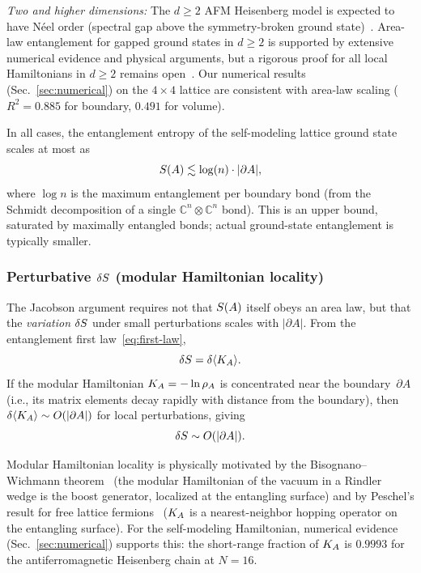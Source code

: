 \emph{Two and higher dimensions:}  The $d \geq 2$ AFM Heisenberg model
is expected to have N\'eel order (spectral gap above the
symmetry-broken ground state)~\cite{EisertCramerPlenio2010}.  Area-law
entanglement for gapped ground states in $d \geq 2$ is supported by
extensive numerical evidence and physical arguments, but a rigorous
proof for all local Hamiltonians in $d \geq 2$ remains
open~\cite{EisertCramerPlenio2010}.  Our numerical results
(Sec.~\ref{sec:numerical}) on the $4 \times 4$ lattice are consistent
with area-law scaling ($R^2 = 0.885$ for boundary, $0.491$ for volume).

In all cases, the entanglement entropy of the self-modeling lattice
ground state scales at most as
\begin{equation}
  S(A) \lesssim \log(n) \cdot |\partial A|,
  \label{eq:channel-bound}
\end{equation}
where $\log n$ is the maximum entanglement per boundary bond (from the
Schmidt decomposition of a single $\mathbb{C}^n \otimes \mathbb{C}^n$
bond).  This is an upper bound, saturated by maximally entangled bonds;
actual ground-state entanglement is typically smaller.

\subsubsection{Perturbative $\delta S$ (modular Hamiltonian locality)}
\label{sec:delta-s}

The Jacobson argument requires not that $S(A)$ itself obeys an area
law, but that the \emph{variation} $\delta S$ under small
perturbations scales with $|\partial A|$.  From the entanglement first
law~\eqref{eq:first-law},
\begin{equation}
  \delta S = \delta\langle K_A\rangle.
  \label{eq:delta-s-modH}
\end{equation}
If the modular Hamiltonian $K_A = -\ln\rho_A$ is concentrated near
the boundary~$\partial A$ (i.e., its matrix elements decay rapidly
with distance from the boundary), then
$\delta\langle K_A\rangle \sim O(|\partial A|)$ for local
perturbations, giving
\begin{equation}
  \delta S \sim O(|\partial A|).
  \label{eq:delta-s-boundary}
\end{equation}

Modular Hamiltonian locality is physically motivated by the
Bisognano--Wichmann theorem~\cite{BisognanoWichmann1976} (the modular
Hamiltonian of the vacuum in a Rindler wedge is the boost generator,
localized at the entangling surface) and by Peschel's result for free
lattice fermions~\cite{Peschel2003} ($K_A$ is a nearest-neighbor
hopping operator on the entangling surface).  For the self-modeling
Hamiltonian, numerical evidence (Sec.~\ref{sec:numerical}) supports
this: the short-range fraction of $K_A$ is $0.9993$ for the
antiferromagnetic Heisenberg chain at $N = 16$.

